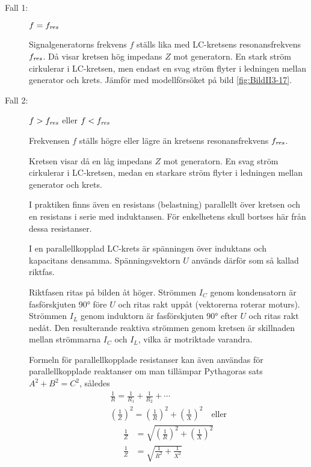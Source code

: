 \begin{description}

\item[Fall 1:] \(f = f_{\it res}\)

Signalgeneratorns frekvens \(f\) ställs lika med LC-kretsens resonansfrekvens
\(f_{\it res}\).
Då visar kretsen hög impedans \(Z\) mot generatorn.
En stark ström cirkulerar i LC-kretsen, men endast en svag ström flyter i
ledningen mellan generator och krets.
Jämför med modellförsöket på bild \ref{fig:BildII3-17}.

\item[Fall 2:] \(f > f_{\it res}\) eller \(f < f_{\it res}\)

Frekvensen \(f\) ställs högre eller lägre än kretsens resonansfrekvens
\(f_{\it res}\).

Kretsen visar då en låg impedans \(Z\) mot generatorn.
En svag ström cirkulerar i LC-kretsen, medan en starkare ström flyter i
ledningen mellan generator och krets.

I praktiken finns även en resistans (belastning) parallellt över kretsen och en
resistans i serie med induktansen.
För enkelhetens skull bortses här från dessa resistanser.

I en parallellkopplad LC-krets är spänningen över induktans och kapacitans
densamma.
Spänningsvektorn \(U\) används därför som så kallad riktfas.

Riktfasen ritas på bilden åt höger.
Strömmen \(I_C\) genom kondensatorn är fasförskjuten \ang{90} före \(U\) och
ritas rakt uppåt (vektorerna roterar moturs).
Strömmen \(I_L\) genom induktorn är fasförskjuten \ang{90} efter \(U\) och
ritas rakt nedåt.
Den resulterande reaktiva strömmen genom kretsen är skillnaden mellan
strömmarna \(I_C\) och \(I_L\), vilka är motriktade varandra.

Formeln för parallellkopplade resistanser kan även användas för
parallellkopplade reaktanser om man tillämpar Pythagoras sats
\(A^2 + B^2 = C^2\), således
%
\begin{gather*}
	\frac{1}{R} = \frac{1}{R_1} + \frac{1}{R_2} + \cdots \\
	\left(\frac{1}{Z}\right)^2 = \left(\frac{1}{R}\right)^2 +
	\left(\frac{1}{X}\right)^2 \quad \text{eller}
\end{gather*}
\begin{align*}
	\frac{1}{Z} &= \sqrt{\left(\frac{1}{R}\right)^2 + \left(\frac{1}{X}\right)^2} \\
	\frac{1}{Z} &= \sqrt{\frac{1}{R^2} + \frac{1}{X^2}}
\end{align*}


\end{description}
